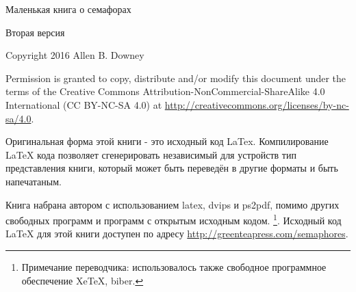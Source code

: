 \vspace{2in}
\begin{center}
{\Large Маленькая книга о семафорах}

Вторая версия
\vspace{0.25in}

\theversion
\vspace{0.25in}

Copyright 2016 Allen B. Downey
\end{center}
\vspace{0.25in}

Permission is granted to copy, distribute and/or modify this
document under the terms of the Creative Commons
Attribution-NonCommercial-ShareAlike 4.0 International (CC BY-NC-SA 4.0)
at \url{http://creativecommons.org/licenses/by-nc-sa/4.0}.

Оригинальная форма этой книги - это исходный код LaTex.
Компилирование LaTeX кода позволяет сгенерировать
независимый для устройств тип представления книги, который может быть
переведён в другие форматы и быть напечатаным.

Книга набрана автором с использованием latex, dvips и ps2pdf, помимо других
свободных программ и программ с открытым исходным кодом.
\footnote{Примечание переводчика: использовалось также свободное программное 
обеспечение XeTeX, biber.}.
Исходный код LaTeX для этой книги доступен по адресу
\url{http://greenteapress.com/semaphores}.

\frontmatter
